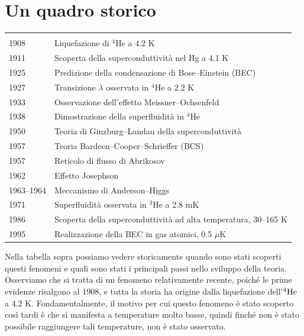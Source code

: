 \section{Un quadro storico}
\begin{table}[H]
   \centering
   \footnotesize
   \begin{tabular}{ll}
      \hline
      &\\[-0.2cm]
      1908 & Liquefazione di $^4$He a 4.2 K \\[0.1cm]
      1911 & Scoperta della superconduttività nel Hg a 4.1 K \\[0.1cm]
      1925 & Predizione della condensazione di Bose--Einstein (BEC) \\[0.1cm]
      1927 & Transizione $\lambda$ osservata in $^4$He a 2.2 K \\[0.1cm]
      1933 & Osservazione dell'effetto Meissner--Ochsenfeld \\[0.1cm]
      1938 & Dimostrazione della superfluidità in $^4$He \\[0.1cm]
      1950 & Teoria di Ginzburg--Landau della superconduttività \\[0.1cm]
      1957 & Teoria Bardeen--Cooper--Schrieffer (BCS) \\[0.1cm]
      1957 & Reticolo di flusso di Abrikosov \\[0.1cm]
      1962 & Effetto Josephson \\[0.1cm]
      1963--1964 & Meccanismo di Anderson--Higgs \\[0.1cm]
      1971 & Superfluidità osservata in $^3$He a 2.8 mK \\[0.1cm]
      1986 & Scoperta della superconduttività ad alta temperatura, 30--165 K \\[0.1cm]
      1995 & Realizzazione della BEC in gas atomici, 0.5 $\mu$K \\[0.1cm]
      \hline
   \end{tabular}
\end{table}
Nella tabella sopra possiamo vedere storicamente quando sono stati scoperti questi fenomeni e quali sono stati i principali passi nello sviluppo della teoria. Osserviamo che si tratta di un fenomeno relativamente recente, poiché le prime evidenze risalgono al 1908, e tutta la storia ha origine dalla liquefazione dell'$\rm ^4He$ a 4.2 K. Fondamentalmente, il motivo per cui questo fenomeno è stato scoperto così tardi è che si manifesta a temperature molto basse, quindi finché non è stato possibile raggiungere tali temperature, non è stato osservato.\\
